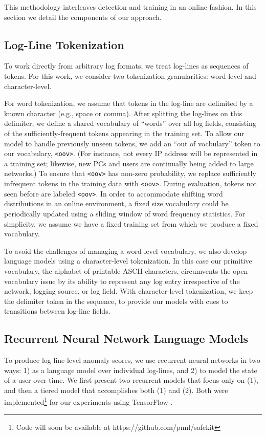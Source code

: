 \documentclass[letterpaper]{article} %
\begin{document}
This methodology interleaves detection and training in an online fashion.
In this section we detail the components of our approach.

\subsection{Log-Line Tokenization} \label{subsec:token}
To work directly from arbitrary log formats, we treat log-lines as sequences of tokens.
For this work, we consider two tokenization granularities: word-level and character-level.

For word tokenization, we assume that tokens in the log-line are delimited by a known character (e.g., space or comma).
After splitting the log-lines on this delimiter, we define a shared vocabulary of ``words'' over all log fields, consisting of the sufficiently-frequent tokens appearing in the training set.
To allow our model to handle previously unseen tokens, we add an ``out of vocbulary'' token to our vocabulary, \verb|<oov>|.
(For instance, not every IP address will be represented in a training set; likewise, new PCs and users are continually being added to large networks.)
To ensure that \verb|<oov>| has non-zero probability, we replace sufficiently infrequent tokens in the training data with \verb|<oov>|.
During evaluation, tokens not seen before are labeled \verb|<oov>|.
In order to accommodate shifting word distributions in an online environment, a fixed size vocabulary could be periodically updated using a sliding window of word frequency statistics. For simplicity, we assume we have a fixed training set from which we produce a fixed vocabulary.

To avoid the challenges of managing a word-level vocabulary, we also develop language models using a character-level tokenization.
In this case our primitive vocabulary, the alphabet of printable ASCII characters, circumvents the open vocabulary issue by its ability to represent any log entry irrespective of the network, logging source, or log field.  With character-level tokenization, we keep the delimiter token in the sequence, to provide our models with cues to transitions between log-line fields.

\subsection{Recurrent Neural Network Language Models} \label{subsec:rnns}
To produce log-line-level anomaly scores, we use recurrent neural networks in two ways:
1) as a language model over individual log-lines, and
2) to model the state of a user over time.
We first present two recurrent models that focus only on (1),
and then a tiered model that accomplishes both (1) and (2).
Both were implemented\footnote{Code will soon be available at https://github.com/pnnl/safekit} for our experiments using TensorFlow \cite{tensorflow2015-whitepaper}.
\end{document}
